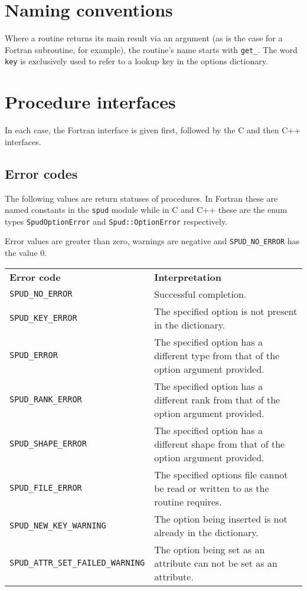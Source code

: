 \documentclass[a4paper, 11pt]{book}
\begin{document}
\section{Naming conventions}

Where a routine returns its main result via an argument (as is the case for
a Fortran subroutine, for example), the routine's name starts with
\lstinline[language=fortran]+get_+. The word
\lstinline[language=fortran]+key+ is exclusively used to refer to a lookup key in
the options dictionary.

\section{Procedure interfaces}
\lstset{frame=single}

In each case, the Fortran interface is given first, followed by the C and
then C++ interfaces.

\subsection{Error codes}\label{sec:error_codes}

The following values are return statuses of procedures. In Fortran these are
named constants in the \lstinline+spud+ module while in C and C++ these are
the enum types \lstinline+SpudOptionError+ and \lstinline+Spud::OptionError+
respectively.

Error values are greater than zero, warnings are negative and
\lstinline+SPUD_NO_ERROR+ has the value 0.

\begin{tabular}{lp{8cm}}
  \textbf{Error code} & \textbf{Interpretation}\\
  \lstinline+SPUD_NO_ERROR+ & Successful completion.\\
  \lstinline+SPUD_KEY_ERROR+ & The specified option is not present in the
  dictionary.\\
  \lstinline+SPUD_ERROR+ & The specified option has a different type
  from that of the option argument provided.\\
  \lstinline+SPUD_RANK_ERROR+ & The specified option has a different rank
  from that of the option argument provided.\\
  \lstinline+SPUD_SHAPE_ERROR+ & The specified option has a different shape
  from that of the option argument provided.\\
  \lstinline+SPUD_FILE_ERROR+ & The specified options file cannot be read or
  written to as the routine requires.\\
  \lstinline+SPUD_NEW_KEY_WARNING+ & The option being inserted is not
  already in the dictionary.\\
  \lstinline+SPUD_ATTR_SET_FAILED_WARNING+ & The option being set as an
  attribute can not be set as an attribute.
\end{tabular}
\end{document}
